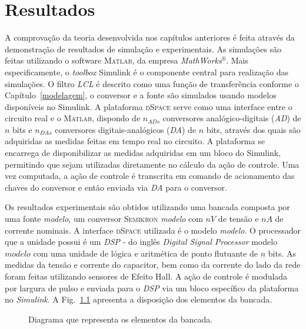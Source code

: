 
\chapter{Resultados}\label{resultados}

  A comprovação da teoria desenvolvida nos capítulos anteriores é feita através da demonstração de resultados de simulação e experimentais. As simulações são feitas utilizando o software \textsc{Matlab}, da empresa \textit{MathWorks}$^\circledR$. Mais especificamente, o \textit{toolbox} Simulink é o componente central para realização das simulações. O filtro \textit{LCL} é descrito como uma função de transferência conforme o Capítulo~\ref{modelagem}, o conversor e a fonte são simulados usando modelos disponíveis no Simulink. A plataforma \textsc{dSpace} serve como uma interface entre o circuito real e o \textsc{Matlab}, dispondo de $n_{ADs}$ conversores analógico-digitais (\emph{AD}) de $n$ bits e $n_{DAs}$ conversores digitais-analógicos (\emph{DA}) de $n$ bits, através dos quais são adquiridas as medidas feitas em tempo real no circuito. A plataforma se encarrega de disponibilizar as medidas adquiridas em um bloco do Simulink, permitindo que sejam utilizadas diretamente no cálculo da ação de controle. Uma vez computada, a ação de controle é transcrita em comando de acionamento das chaves do conversor e então enviada via \emph{DA} para o conversor.

  Os resultados experimentais são obtidos utilizando uma bancada composta por uma fonte \textit{modelo}, um conversor \textsc{Semikron} \textit{modelo} com $n V$ de tensão e $n A$ de corrente nominais. A interface \textsc{dSpace} utilizada é o modelo \textit{modelo}. O processador que a unidade possui é um \emph{DSP} - do inglês \emph{Digital Signal Processor} modelo $modelo$ com uma unidade de lógica e aritmética de ponto flutuante de $n$ bits. As medidas da tensão e corrente do capacitor, bem como da corrente do lado da rede foram feitas utilizando sensores de Efeito Hall. A ação de controle é modulada por largura de pulso e enviada para o \emph{DSP} via um bloco específico da plataforma no \emph{Simulink}. A Fig.~\ref{fig:topologia_bancada} apresenta a disposição dos elementos da bancada.

  \begin{figure}[htb]
    \centering{
      \def\svgwidth{0.9\textwidth}
      }
    \renewcommand\figurename{Fig.}
    \caption{Diagrama que representa os elementos da bancada.}
    \label{fig:topologia_bancada}
  \end{figure}


